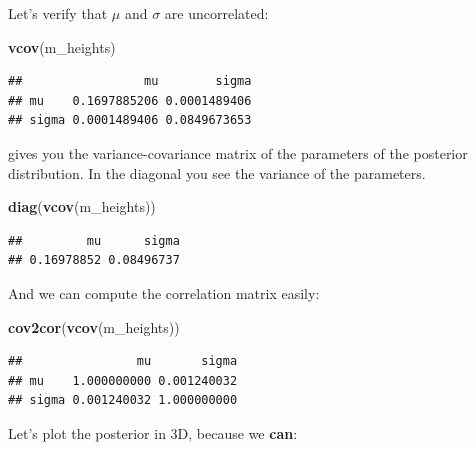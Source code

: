 \documentclass[
]{book}
\newenvironment{Shaded}{\begin{snugshade}}{\end{snugshade}}
\newcommand{\FunctionTok}[1]{\textcolor[rgb]{0.13,0.29,0.53}{\textbf{#1}}}
\newcommand{\NormalTok}[1]{#1}
\begin{document}
Let's verify that \(\mu\) and \(\sigma\) are uncorrelated:

\begin{Shaded}
\begin{Highlighting}[]
\FunctionTok{vcov}\NormalTok{(m\_heights)}
\end{Highlighting}
\end{Shaded}

\begin{verbatim}
##                 mu        sigma
## mu    0.1697885206 0.0001489406
## sigma 0.0001489406 0.0849673653
\end{verbatim}

gives you the variance-covariance matrix of the parameters of the posterior
distribution. In the diagonal you see the variance of the parameters.

\begin{Shaded}
\begin{Highlighting}[]
\FunctionTok{diag}\NormalTok{(}\FunctionTok{vcov}\NormalTok{(m\_heights))}
\end{Highlighting}
\end{Shaded}

\begin{verbatim}
##         mu      sigma 
## 0.16978852 0.08496737
\end{verbatim}

And we can compute the correlation matrix easily:

\begin{Shaded}
\begin{Highlighting}[]
\FunctionTok{cov2cor}\NormalTok{(}\FunctionTok{vcov}\NormalTok{(m\_heights))}
\end{Highlighting}
\end{Shaded}

\begin{verbatim}
##                mu       sigma
## mu    1.000000000 0.001240032
## sigma 0.001240032 1.000000000
\end{verbatim}

Let's plot the posterior in 3D, because we \textbf{can}:
\end{document}
